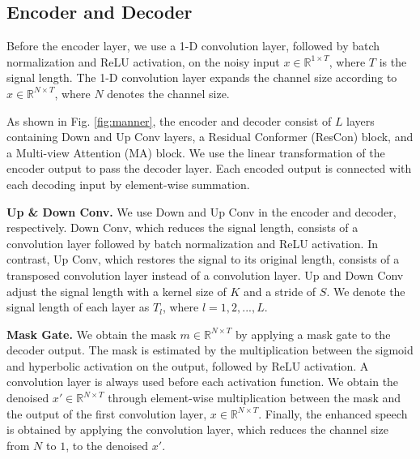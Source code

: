 \documentclass{article}
\begin{document}
\subsection{Encoder and Decoder}
\label{sec:encoder}

Before the encoder layer, we use a 1-D convolution layer, followed by batch normalization and ReLU activation, on the noisy input $x \in \mathbb{R}^{1 \times T}$, where $T$ is the signal length. The 1-D convolution layer expands the channel size according to $x \in \mathbb{R}^{N \times T}$, where $N$ denotes the channel size.
 
 As shown in Fig. \ref{fig:manner}, the encoder and decoder consist of $L$ layers containing Down and Up Conv layers, a Residual Conformer (ResCon) block, and a Multi-view Attention (MA) block. We use the linear transformation of the encoder output to pass the decoder layer. Each encoded output is connected with each decoding input by element-wise summation.

\noindent \textbf{Up \& Down Conv.} We use Down and Up Conv in the encoder and decoder, respectively. Down Conv, which reduces the signal length, consists of a convolution layer followed by batch normalization and ReLU activation. In contrast, Up Conv, which restores the signal to its original length, consists of a transposed convolution layer instead of a convolution layer. Up and Down Conv adjust the signal length with a kernel size of $K$ and a stride of $S$. We denote the signal length of each layer as $T_{l}$, where $l={1,2,...,L}$. 

\noindent \textbf{Mask Gate.} We obtain the mask $m \in \mathbb{R}^{N \times T}$ by applying a mask gate to the decoder output. The mask is estimated by the multiplication between the sigmoid and hyperbolic activation on the output, followed by ReLU activation. A convolution layer is always used before each activation function. We obtain the denoised $x' \in \mathbb{R}^{N \times T}$ through element-wise multiplication between the mask and the output of the first convolution layer, $x \in \mathbb{R}^{N \times T}$. Finally, the enhanced speech is obtained by applying the convolution layer, which reduces the channel size from $N$ to $1$, to the denoised $x'$.
\end{document}
